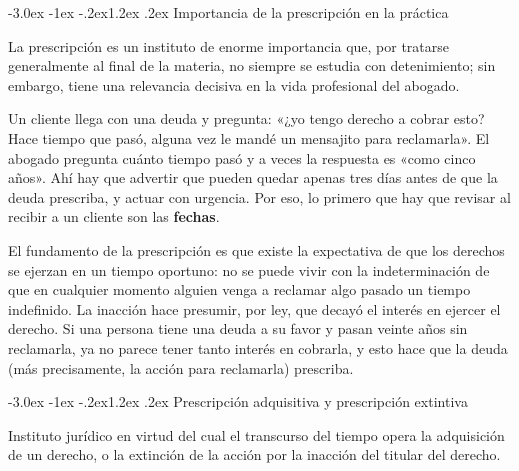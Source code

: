 \documentclass[12pt,oneside]{book}
\makeatletter
\renewcommand\section{\@startsection{section}{1}{\z@}%
  {-3.0ex \@plus -1ex \@minus -.2ex}{1.2ex \@plus .2ex}%
  {\normalfont\large\bfseries\color{acento}}}
\makeatother
\begin{document}
\section{Importancia de la prescripción en la práctica}

La prescripción es un instituto de enorme importancia que, por tratarse generalmente al final de la materia, no siempre se estudia con detenimiento; sin embargo, tiene una relevancia decisiva en la vida profesional del abogado.

\begin{ejemplo}
Un cliente llega con una deuda y pregunta: «¿yo tengo derecho a cobrar esto? Hace tiempo que pasó, alguna vez le mandé un mensajito para reclamarla». El abogado pregunta cuánto tiempo pasó y a veces la respuesta es «como cinco años». Ahí hay que advertir que pueden quedar apenas tres días antes de que la deuda prescriba, y actuar con urgencia. Por eso, lo primero que hay que revisar al recibir a un cliente son las \textbf{fechas}.
\end{ejemplo}

El fundamento de la prescripción es que existe la expectativa de que los derechos se ejerzan en un tiempo oportuno: no se puede vivir con la indeterminación de que en cualquier momento alguien venga a reclamar algo pasado un tiempo indefinido. La inacción hace presumir, por ley, que decayó el interés en ejercer el derecho. Si una persona tiene una deuda a su favor y pasan veinte años sin reclamarla, ya no parece tener tanto interés en cobrarla, y esto hace que la deuda (más precisamente, la acción para reclamarla) prescriba.

\section{Prescripción adquisitiva y prescripción extintiva}

\begin{definicion}[{Prescripción}]
Instituto jurídico en virtud del cual el transcurso del tiempo opera la adquisición de un derecho, o la extinción de la acción por la inacción del titular del derecho.
\end{definicion}
\end{document}

